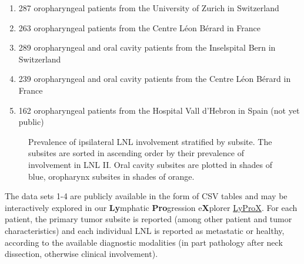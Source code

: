 \documentclass[11pt,twocolumn,twoside]{article}
\providecommand{\tightlist}{%
  \setlength{\itemsep}{0pt}\setlength{\parskip}{0pt}}\usepackage{longtable,booktabs,array}
\begin{document}
\begin{enumerate}
\def\labelenumi{\arabic{enumi}.}
\tightlist
\item
  287 oropharyngeal patients from the University of Zurich in
  Switzerland
\item
  263 oropharyngeal patients from the Centre Léon Bérard in France
\item
  289 oropharyngeal and oral cavity patients from the Inselspital Bern
  in Switzerland
\item
  239 oropharyngeal and oral cavity patients from the Centre Léon Bérard
  in France
\item
  162 oropharyngeal patients from the Hospital Vall d'Hebron in Spain (not yet public)
\end{enumerate}

\begin{figure}[b]


\caption{\label{fig-prevalence-by-subsite}Prevalence of ipsilateral LNL involvement stratified by subsite. The subsites are sorted in ascending order by their prevalence of involvement in LNL II. Oral cavity subsites are
plotted in shades of blue, oropharynx subsites in shades of orange.}

\end{figure}%

The data sets 1-4 are publicly available in the form of CSV tables
\autocite{ludwig_detailed_2022,ludwig_multi-centric_2023} and may be
interactively explored in our \textbf{Ly}mphatic \textbf{Pro}gression
e\textbf{X}plorer \href{https://lyprox.org}{LyProX}. For each patient, the primary tumor
subsite is reported (among other patient and tumor characteristics) and
each individual LNL is reported as metastatic or healthy, according to
the available diagnostic modalities (in part pathology after neck
dissection, otherwise clinical involvement).
\end{document}
